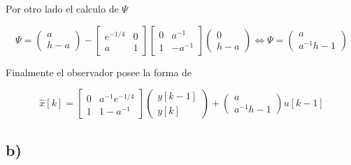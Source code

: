 \documentclass[11pt,a4paper]{article}
\begin{document}
        Por otro lado el calculo de $\Psi$

        \begin{equation}
            \Psi = 
            \begin{pmatrix}
                a \\ h -a
            \end{pmatrix}
            -
            \begin{bmatrix}
                e^{-1/4} & 0 \\
                a & 1
            \end{bmatrix}
            \begin{bmatrix}
                0 & a^{-1} \\
                1 & -a^{-1}
            \end{bmatrix}
            \begin{pmatrix}
                0 \\
                h-a                
            \end{pmatrix}
            \Leftrightarrow
            \Psi = 
            \begin{pmatrix}
                a \\ a^{-1}h -1
            \end{pmatrix}
        \end{equation}

        Finalmente el observador posee la forma de 

        \begin{equation}
            \hat{x}[k] = 
            \begin{bmatrix}
                0 & a^{-1}e^{-1/4} \\
                1 & 1 - a^{-1}    
            \end{bmatrix}
            \begin{pmatrix}
                y[k-1] \\ y[k]
            \end{pmatrix}
            +
            \begin{pmatrix}
                a \\ a^{-1}h - 1
            \end{pmatrix}
            u[k-1]
        \end{equation}
    
    \subsection*{b)}
\end{document}
